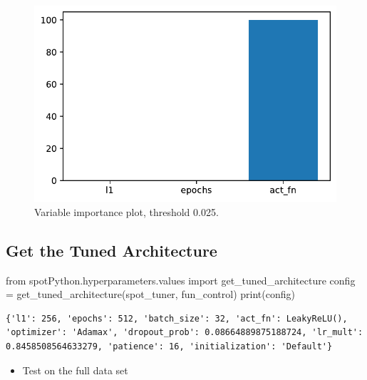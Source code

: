 \documentclass[
  letterpaper,
  DIV=11,
  numbers=noendperiod]{scrreprt}
\newenvironment{Shaded}{\begin{snugshade}}{\end{snugshade}}
\newcommand{\BuiltInTok}[1]{\textcolor[rgb]{0.00,0.23,0.31}{#1}}
\newcommand{\ImportTok}[1]{\textcolor[rgb]{0.00,0.46,0.62}{#1}}
\newcommand{\NormalTok}[1]{\textcolor[rgb]{0.00,0.23,0.31}{#1}}
\newcommand{\OperatorTok}[1]{\textcolor[rgb]{0.37,0.37,0.37}{#1}}
\providecommand{\tightlist}{%
  \setlength{\itemsep}{0pt}\setlength{\parskip}{0pt}}\usepackage{longtable,booktabs,array}
\begin{document}
\begin{figure}[H]

{\centering \includegraphics{033_spot_lightning_linear_sensitive_files/figure-pdf/cell-19-output-1.pdf}

}

\caption{Variable importance plot, threshold 0.025.}

\end{figure}%

\subsection{Get the Tuned Architecture}\label{sec-get-spot-results-33}

\begin{Shaded}
\begin{Highlighting}[]
\ImportTok{from}\NormalTok{ spotPython.hyperparameters.values }\ImportTok{import}\NormalTok{ get\_tuned\_architecture}
\NormalTok{config }\OperatorTok{=}\NormalTok{ get\_tuned\_architecture(spot\_tuner, fun\_control)}
\BuiltInTok{print}\NormalTok{(config)}
\end{Highlighting}
\end{Shaded}

\begin{verbatim}
{'l1': 256, 'epochs': 512, 'batch_size': 32, 'act_fn': LeakyReLU(), 'optimizer': 'Adamax', 'dropout_prob': 0.08664889875188724, 'lr_mult': 0.8458508564633279, 'patience': 16, 'initialization': 'Default'}
\end{verbatim}

\begin{itemize}
\tightlist
\item
  Test on the full data set
\end{itemize}
\end{document}
